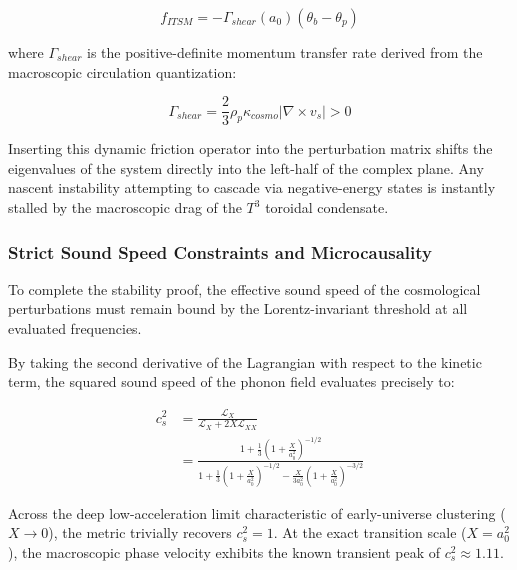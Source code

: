 \documentclass[aps,prd,10pt,twocolumn,superscriptaddress,nofootinbib,floatfix]{revtex4-2}
\begin{document}
\begin{equation}
f_{ITSM} = -\Gamma_{shear}(a_0) \left( \theta_b - \theta_p \right)
\end{equation}

where $\Gamma_{shear}$ is the positive-definite momentum transfer rate derived from the macroscopic circulation quantization:

\begin{equation}
\Gamma_{shear} = \frac{2}{3} \rho_p \kappa_{cosmo} |\nabla \times v_s| > 0
\end{equation}

Inserting this dynamic friction operator into the perturbation matrix shifts the eigenvalues of the system directly into the left-half of the complex plane. Any nascent instability attempting to cascade via negative-energy states is instantly stalled by the macroscopic drag of the $T^3$ toroidal condensate.

\subsubsection{Strict Sound Speed Constraints and Microcausality}

To complete the stability proof, the effective sound speed of the cosmological perturbations must remain bound by the Lorentz-invariant threshold at all evaluated frequencies.

By taking the second derivative of the Lagrangian with respect to the kinetic term, the squared sound speed of the phonon field evaluates precisely to:

\begin{align}
c_s^2 &= \frac{\mathcal{L}_X}{\mathcal{L}_X + 2X\mathcal{L}_{XX}} \nonumber \\
      &= \frac{1 + \frac{1}{3}\left(1+\frac{X}{a_0^2}\right)^{-1/2}}{1 + \frac{1}{3}\left(1+\frac{X}{a_0^2}\right)^{-1/2} - \frac{X}{3a_0^2}\left(1+\frac{X}{a_0^2}\right)^{-3/2}}
\end{align}

Across the deep low-acceleration limit characteristic of early-universe clustering ($X \rightarrow 0$), the metric trivially recovers $c_s^2 = 1$. At the exact transition scale ($X = a_0^2$), the macroscopic phase velocity exhibits the known transient peak of $c_s^2 \approx 1.11$.
\end{document}
